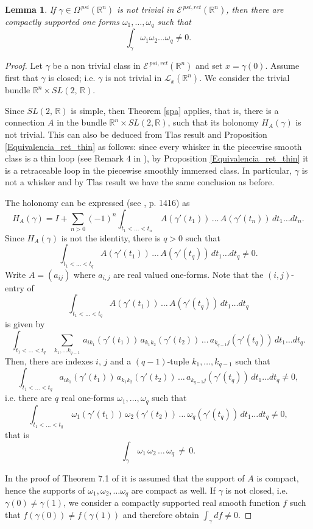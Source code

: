 \documentclass{amsart}
\newtheorem{lemma}[theorem]{Lemma}
\begin{document}
\begin{lemma}\label{fundamental}
If $\gamma\in \Omega^{\,psi}(\mathbb R^n)$ is not trivial in ${\mathcal E}^{\,psi,ret}(\mathbb R^n)$, then there are compactly supported one forms $\omega_1,\ldots, \omega_q$ such that 
\[  \int_{\gamma}  \omega_{1}  \omega_2 \ldots  \omega_q\neq 0.\]
\end{lemma}
\begin{proof}

Let $\gamma$ be a non trivial class in ${\mathcal E}^{\,psi,ret}(\mathbb R^n)$ and set $x=\gamma(0)$. Assume first that $\gamma$ is closed; i.e. $\gamma$ is not trivial in $\mathcal L_x(\mathbb{R}^n )$. We consider the trivial bundle  $\mathbb{R}^n \times SL(2,\, \mathbb R)$. 

Since $SL(2,\, \mathbb R)$ is simple, then Theorem \ref{spa} applies, that is, there is a 
connection $A$ in the bundle $\mathbb{R}^n \times SL(2, \mathbb R)$, such that its holonomy $H_A(\gamma)$ is not trivial. This can also be deduced from Tlas result \cite{Tlas} and Proposition \ref{Equivalencia_ret_thin} as follows: since every whisker in the piecewise smooth class is a thin loop (see Remark $4$ in \cite{Meneses}), by Proposition \ref{Equivalencia_ret_thin} it is a retraceable loop in the piecewise smoothly immersed class. In particular, $\gamma$ is not a whisker and by Tlas result we have the same conclusion as before.

The holonomy can be expressed (see \cite{Loll}, p. 1416) as
\[  H_A(\gamma)= I+ \sum_{n>0}   (-1)^n \int_{t_1<\ldots< t_n}\,  A(\gamma'(t_1))\,   \ldots\,  A(\gamma'(t_n))\,  dt_1\ldots dt_n.   \]
Since  $H_A(\gamma)$ is not the identity, there is $q>0$ such that   
\[  \int_{t_1<\ldots< t_q} A(\gamma'(t_1))\,   \ldots\,  A(\gamma'(t_q))\,dt_1\ldots dt_q\neq 0.\]
Write $A=\left(a_{ij}\right)$ where $a_{i,j}$ are real valued one-forms. Note that the $(i,j)$- entry of 
\[  \int_{t_1<\ldots< t_q} A(\gamma'(t_1))\,   \ldots\,  A(\gamma'(t_q))\,dt_1\ldots dt_q\]
is given by 
\[  \int_{t_1<\ldots< t_q} \sum_{k_1,\ldots k_{q-1}}\, a_{ik_1}(\gamma'(t_1))\,   a_{k_1k_2}(\gamma'(t_2))\,  \ldots\,  a_{k_{q-1} j}(\gamma'(t_q))\,dt_1\ldots dt_q.\]
Then, there are indexes $i,\, j$ and a $(q-1)$-tuple  $k_1,\ldots, k_{q-1}$ such that 
\[  \int_{t_1<\ldots< t_q}  a_{ik_1}(\gamma'(t_1))\,   a_{k_1k_2}(\gamma'(t_2))\,  \ldots\,  a_{k_{q-1} j}(\gamma'(t_q))\,dt_1\ldots dt_q\neq 0,\]
i.e. there are $q$ real one-forms $\omega_1, \ldots, \omega_q$ such that 
\[  \int_{t_1<\ldots< t_q}\,  \omega_{1}(\gamma'(t_1))\,   \omega_2(\gamma'(t_2))\,  \ldots\,  \omega_q(\gamma'(t_q))\,dt_1\ldots dt_q\neq 0,\]
that is 
\[  \int_{\gamma}\,  \omega_{1}\,  \omega_2 \,\ldots\,  \omega_q\,\neq\, 0.\]



In the proof of Theorem 7.1 of  \cite{Holonomy} it is assumed that the support of $A$ is compact, hence the supports of $ \omega_{1},  \omega_2, \ldots  \omega_q$ are compact as well.
If $\gamma$ is not closed, i.e. $\gamma(0)\neq \gamma(1)$,  we consider a compactly supported real smooth function  $f$ such that $f(\gamma(0))\neq f(\gamma(1))$ and therefore obtain
$\int_{\gamma}df\neq 0$. 
\end{proof}
\end{document}
